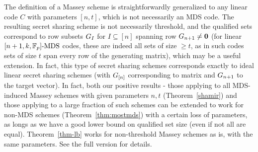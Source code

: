 \begin{remark}
The definition of a Massey scheme is straightforwardly generalized to any linear code $C$ with parameters $[n,t]$, which is not
necessarily an MDS code. The resulting secret sharing scheme is not necessarily threshold, and the qualified sets correspond to row subsets $G_I$ for $I\subseteq [n]$ spanning row $G_{n+1}\neq \mathbf{0}$ (for linear $[n+1,k,\mathbb{F}_p]\text{-MDS}$ codes, these are indeed all sets of size $\geq t$, as in such codes sets of size $t$ span every row of the generating matrix), which may be a useful extension. In fact, this type of secret sharing schemes corresponds exactly to ideal linear secret sharing schemes (with $G_{[n]}$ corresponding to matrix and $G_{n+1}$ to the target vector). In fact, both our positive results - those applying to all MDS-induced Massey schemes with given parameters $n,t$ (Theorem~\ref{shamir}) and those applying to a large fraction of such schemes can be extended to work for non-MDS schemes (Theorem~\ref{thm:mostmds}) with a certain loss of parameters, as longs as we have a good lower bound on qualified set size (even if not all are equal). Theorem~\ref{thm-lb} works for non-threshold Massey schemes as is, with the same parameters. See the full version for details.
\end{remark}



